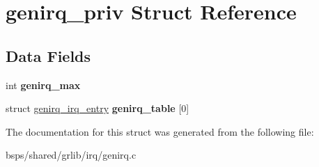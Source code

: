 \hypertarget{structgenirq__priv}{}\section{genirq\+\_\+priv Struct Reference}
\label{structgenirq__priv}
\subsection*{Data Fields}
\begin{DoxyCompactItemize}
\item 
\mbox{\label{structgenirq__priv_a792ac5c45e2dd510006e0716617d966b}} 
int {\bfseries genirq\+\_\+max}
\item 
\mbox{\label{structgenirq__priv_ab4f1e7be890e292b0d3895814af9532a}} 
struct \mbox{\hyperlink{structgenirq__irq__entry}{genirq\+\_\+irq\+\_\+entry}} {\bfseries genirq\+\_\+table} \mbox{[}0\mbox{]}
\end{DoxyCompactItemize}


The documentation for this struct was generated from the following file\+:\begin{DoxyCompactItemize}
\item 
bsps/shared/grlib/irq/genirq.\+c\end{DoxyCompactItemize}
